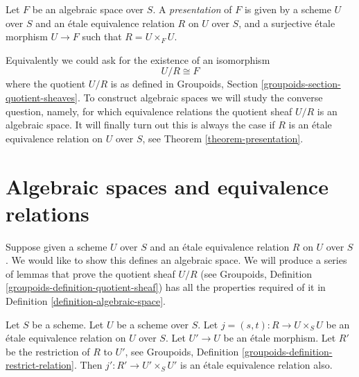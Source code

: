 \begin{definition}
\label{definition-presentation}
Let $F$ be an algebraic space over $S$.
A {\it presentation} of $F$ is given by a scheme
$U$ over $S$ and an \'etale equivalence relation $R$ on $U$ over $S$, and
a surjective \'etale morphism $U \to F$ such that $R = U \times_F U$.
\end{definition}

\noindent
Equivalently we could ask for the existence of an isomorphism
$$
U/R \cong F
$$
where the quotient $U/R$ is as defined in
Groupoids, Section \ref{groupoids-section-quotient-sheaves}.
To construct algebraic spaces we will study the converse question, namely,
for which equivalence relations the quotient sheaf $U/R$ is an algebraic space.
It will finally turn out this is always the case if $R$ is an \'etale
equivalence relation on $U$ over $S$, see Theorem \ref{theorem-presentation}.





























\section{Algebraic spaces and equivalence relations}
\label{section-spaces-from-equivalence-relations}

\noindent
Suppose given a scheme $U$ over $S$
and an \'etale equivalence relation $R$ on $U$ over $S$.
We would like to show this defines an algebraic space.
We will produce a series of lemmas that prove the quotient sheaf $U/R$
(see Groupoids, Definition \ref{groupoids-definition-quotient-sheaf})
has all the properties required
of it in Definition \ref{definition-algebraic-space}.

\begin{lemma}
\label{lemma-pullback-etale-equivalence-relation}
Let $S$ be a scheme. Let $U$ be a scheme over $S$.
Let $j = (s, t) : R \to U \times_S U$
be an \'etale equivalence relation on $U$ over $S$.
Let $U' \to U$ be an \'etale morphism.
Let $R'$ be the restriction of $R$ to $U'$, see
Groupoids, Definition \ref{groupoids-definition-restrict-relation}.
Then $j' : R' \to U' \times_S U'$ is an \'etale equivalence
relation also.
\end{lemma}

